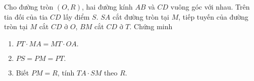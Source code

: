 \begin{bt}
	Cho đường tròn $(O,R)$, hai đường kính $AB$ và $CD$ vuông góc với nhau. Trên tia đối của tia $CD$ lấy điểm $S$. $SA$ cắt đường tròn tại $M$, tiếp tuyến của đường tròn tại $M$ cắt $CD$ ở $O$, $BM$ cắt $CD$ ở $T$. Chứng minh
	\begin{enumerate}
		\item $PT\cdot MA=MT\cdot OA.$
		\item $PS=PM=PT.$
		\item Biết $PM=R$, tính $TA\cdot SM$ theo $R$.
	\end{enumerate}
\end{bt}
